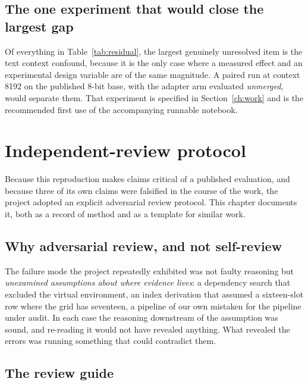 \documentclass[11pt,a4paper]{article}
\begin{document}
\subsection{The one experiment that would close the largest gap}

Of everything in Table~\ref{tab:residual}, the largest genuinely unresolved item
is the text context confound, because it is the only case where a measured effect
and an experimental design variable are of the same magnitude. A paired run at
context \num{8192} on the published 8-bit base, with the adapter arm evaluated
\emph{unmerged}, would separate them. That experiment is specified in
Section~\ref{ch:work} and is the recommended first use of the accompanying
runnable notebook.


\section{Independent-review protocol}
\label{ch:review}

Because this reproduction makes claims critical of a published evaluation, and
because three of its own claims were falsified in the course of the work, the
project adopted an explicit adversarial review protocol. This chapter documents
it, both as a record of method and as a template for similar work.

\subsection{Why adversarial review, and not self-review}

The failure mode the project repeatedly exhibited was not faulty reasoning but
\emph{unexamined assumptions about where evidence lives}: a dependency search that
excluded the virtual environment, an index derivation that assumed a sixteen-slot
row where the grid has seventeen, a pipeline of our own mistaken for the pipeline
under audit. In each case the reasoning downstream of the assumption was sound,
and re-reading it would not have revealed anything. What revealed the errors was
running something that could contradict them.

\subsection{The review guide}
\end{document}
